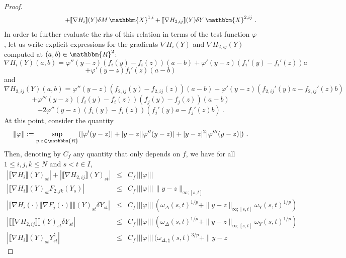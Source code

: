 \documentclass[11pt,reqno,oneside]{amsart}
\numberwithin{equation}{section}
\newcommand{\assign}{:=}
\newcommand{\normtrip}[1]{|\! |\!  | #1 | \! |\!  |}
\newcommand{\vp}{\varphi}
\begin{document}
\begin{proof}
\begin{eqnarray}
		&  &\hspace{3cm} +\llbracket \nabla H_i \rrbracket(Y) \delta M\, \mathbbm{X}^{1,i} + \llbracket \nabla H_{2,ij}
    \rrbracket(Y) \delta Y\, \mathbbm{X}^{2,ij} \ .\label{expan-del-h-nat}
  \end{eqnarray}
 In order to further evaluate the rhs of this relation in terms of the test function $\vp$, let us write
  explicit expressions for the gradients $\nabla H_i (Y)$ and $\nabla H_{2,ij} (Y)$
  computed at $(a, b) \in \mathbbm{R}^2$:
  \[ \nabla H_i (Y)  (a, b) = \varphi'' (y - z) (f_i (y) - f_i (z)) (a - b) +
     \varphi' (y - z) (f_i' (y) - f_i' (z)) a \]
  \[ + \varphi' (y - z) f_i' (z) (a - b) \]
  and
  \[ \nabla H_{2,ij} (Y) (a, b) = \varphi'' (y - z) (f_{2,ij} (y) - f_{2,ij} (z)) (a - b) +
     \varphi' (y - z) (f_{2,ij}' (y) a - f_{2,ij}' (z) b) \]
  \[ + \varphi''' (y - z) (f_i (y) - f_i (z))(f_j (y) - f_j (z)) (a - b)\]
	\[+ 2
     \varphi'' (y - z) (f_i (y) - f_i (z)) (f_j' (y) a - f_j' (z) b)\ . \]
At this point, consider the quantity
\begin{equation}\label{defi:norm-trip}
\normtrip{\varphi} \assign \sup_{y, z \in \mathbbm{R}} (| \varphi' (y - z) | + | y - z
     | | \varphi'' (y - z) | + | y - z |^2 | \varphi''' (y - z) |) \ .
		\end{equation}
  Then, denoting by $C_f$ any quantity that only depends on $f$, we have for all $1\leq i,j,k\leq N$ and $s<t\in I$,
\begin{eqnarray*}
 | \llbracket \nabla H_i\rrbracket (Y)_{st}  | + | \llbracket \nabla
     H_{2,ij}\rrbracket (Y)_{st}  | &\leqslant& C_{f}\, \normtrip{\varphi} \\
 | \llbracket \nabla H_i \rrbracket(Y)_{st}  F_{2,jk} (Y_s) | &\leqslant &
     C_{f}\, \normtrip{\varphi}\, \| y - z \|_{\infty;[s,t]} \\
	 | \llbracket \nabla H_i (\cdot) \llbracket \nabla F_{j} (\cdot) \rrbracket
     \rrbracket(Y)_{s t} \delta Y_{s t} | &\leqslant&  C_{f}\, \normtrip{\varphi}\,
     (\omega_{\Delta} (s, t)^{1 / p} + \| y - z \|_{\infty;[s,t]} \omega_Y (s, t)^{1
     / p}) \\
  | \llbracket \llbracket \nabla H_{2,ij}  \rrbracket \rrbracket(Y)_{s t} \delta
     Y_{s t} | &\leqslant & C_{f}\, \normtrip{\varphi}\, (\omega_{\Delta} (s, t)^{1 / p} + \|
     y - z \|_{\infty;[s,t]} \omega_Y (s, t)^{1 / p}) \\
 | \llbracket \nabla H_i  \rrbracket(Y)_{s t} Y^{\natural}_{s t} | &\leqslant &  C_{f}\, \normtrip{\varphi}\, (\omega_{\Delta, \natural} (s, t)^{3 / p} + \| y - z

\end{eqnarray*}
\end{proof}
\end{document}

